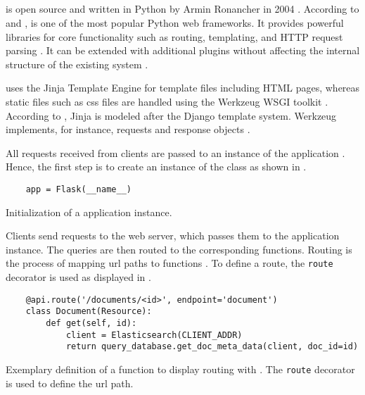 \subsection{\flask{}}\label{sec:BE_flask}

\flask{} is open source and written in Python by Armin Ronancher in 2004 \cite{flask2015, mvc_flask2019}.
According to \citeauthor{flask_book2015} and \citeauthor{mvc_flask2019}, \flask{} is one of the most popular Python web frameworks.
It provides powerful libraries for core functionality such as routing, templating, and HTTP request parsing \cite{flask_book2015}.
It can be extended with additional plugins without affecting the internal structure of the existing system \cite{flask2015}.

\flask{} uses the Jinja Template Engine for template files including HTML pages,
whereas static files such as \ac{css} files are handled using the Werkzeug WSGI toolkit \cite{flask2015}.
According to \citeauthor{flask2015}, Jinja is modeled after the Django template system.
Werkzeug implements, for instance, requests and response objects \cite{mvc_flask2019}.

All requests received from clients are passed to an instance of the \flask{} application \cite{flask_book2018}.
Hence, the first step is to create an instance of the \flask{} class as shown in .

\begin{listing}[htp]
    \begin{verbatim}
    app = Flask(__name__)
    \end{verbatim}
    \caption[Initialization of a \flask{} application instance]{Initialization of a \flask{} application instance.
    }
    \label{lst:flask_app_init}
\end{listing}

Clients send requests to the web server, which passes them to the \flask{} application instance.
The queries are then routed to the corresponding functions.
Routing is the process of mapping \ac{url} paths to functions \cite{flask_book2018}.
To define a route, the \texttt{route} decorator is used as displayed in .

\begin{listing}[htp]
    \begin{verbatim}
    @api.route('/documents/<id>', endpoint='document')
    class Document(Resource):
        def get(self, id):
            client = Elasticsearch(CLIENT_ADDR)
            return query_database.get_doc_meta_data(client, doc_id=id)
    \end{verbatim}
    \caption[Routing using \flask{}]{Exemplary definition of a function to display routing with \flask{}.
    The \texttt{route} decorator is used to define the \ac{url} path.
    }
    \label{lst:flask_routing}
\end{listing}

